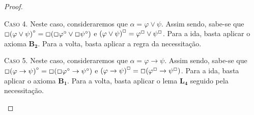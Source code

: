 \begin{theorem}
\begin{proof}
            \begin{case}
                \textsc{Caso 4.}
                Neste caso, consideraremos que $\alpha = \varphi\vee\psi$.
                Assim sendo, sabe-se que $\Box{(\varphi\vee\psi)}^\circ=\Box(\Box\varphi^\circ\vee\Box\psi^\circ)$ e ${(\varphi\vee\psi)}^\Box=\varphi^\Box\vee\psi^\Box$.
                Para a ida, basta aplicar o axioma $\mathbf{B_2}$.
                Para a volta, basta aplicar a regra da necessitação.
            \end{case}

            \begin{case}
                \textsc{Caso 5.}
                Neste caso, consideraremos que $\alpha=\varphi\to\psi$.
                Assim sendo, sabe-se que $\Box{(\varphi\to\psi)}^\circ=\Box(\Box\varphi^\circ\to\psi^\circ)$ e ${(\varphi\to\psi)}^\Box=\Box(\varphi^\Box\to\psi^\Box)$.
                Para a ida, basta aplicar o axioma $\mathbf{B_1}$.
                Para a volta, basta aplicar o lema $\mathbf{L_4}$ seguido pela necessitação.
                \qedhere
            \end{case}
        \end{proof}
    \end{theorem}
